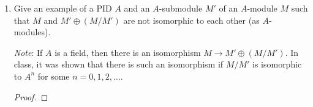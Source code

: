 \documentclass[../psets.tex]{subfiles}
\begin{document}
\begin{enumerate}
\begin{proof}
        \begin{gather*}
            a(S+T)(m) = a[S(m)+T(m)]
                = aS(m)+aT(m)
                = (aS+aT)(m)\\
            a(S+T) = aS+aT\tag{1}
        \end{gather*}
        \begin{gather*}
            (a+b)T(m) = aT(m)+bT(m)\\
            (a+b)T = aT+bT\tag{2}
        \end{gather*}
        \begin{gather*}
            a(bT(m)) = (ab)T(m)\\
            a(bT) = (ab)T\tag{3}
        \end{gather*}
        \begin{gather*}
            1_RT(m) = T(m)\\
            1_RT = T\tag{4}
        \end{gather*}
        Therefore, $\Hom_R(M,N)$ is an $R$-module, as desired.
    \end{proof}
    \item Give an example of a PID $A$ and an $A$-submodule $M'$ of an $A$-module $M$ such that $M$ and $M'\oplus(M/M')$ are not isomorphic to each other (as $A$-modules).\par
    \emph{Note}: If $A$ is a field, then there is an isomorphism $M\to M'\oplus(M/M')$. In class, it was shown that there is such an isomorphism if $M/M'$ is isomorphic to $A^n$ for some $n=0,1,2,\dots$.
    \begin{proof}




\end{proof}
\end{enumerate}
\end{document}
